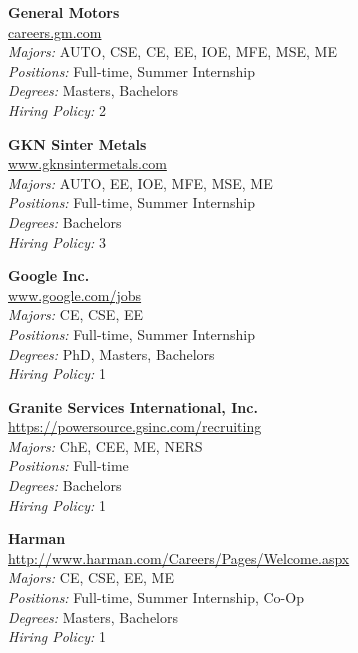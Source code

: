 \documentclass[twoside]{article}
\begin{document}
\begin{center}
\begin{multicols}{3}
\begin{minipage}{.9\columnwidth}{\Large\bf General Motors }\\
	\url{careers.gm.com}\\
	\emph{Majors:} AUTO, CSE, CE, EE, IOE, MFE, MSE, ME\\
	\emph{Positions:} Full-time, Summer Internship\\
	\emph{Degrees:} Masters, Bachelors\\
	\emph{Hiring Policy:} 2\\
\end{minipage}
 
\begin{minipage}{.9\columnwidth}{\Large\bf GKN Sinter Metals }\\
	\url{www.gknsintermetals.com}\\
	\emph{Majors:} AUTO, EE, IOE, MFE, MSE, ME\\
	\emph{Positions:} Full-time, Summer Internship\\
	\emph{Degrees:} Bachelors\\
	\emph{Hiring Policy:} 3\\
\end{minipage}
 
\begin{minipage}{.9\columnwidth}{\Large\bf Google Inc. }\\
	\url{www.google.com/jobs}\\
	\emph{Majors:} CE, CSE, EE\\
	\emph{Positions:} Full-time, Summer Internship\\
	\emph{Degrees:} PhD, Masters, Bachelors\\
	\emph{Hiring Policy:} 1\\
\end{minipage}
 
\begin{minipage}{.9\columnwidth}{\Large\bf Granite Services International, Inc. }\\
	\url{https://powersource.gsinc.com/recruiting}\\
	\emph{Majors:} ChE, CEE, ME, NERS\\
	\emph{Positions:} Full-time\\
	\emph{Degrees:} Bachelors\\
	\emph{Hiring Policy:} 1\\
\end{minipage}
 
\begin{minipage}{.9\columnwidth}{\Large\bf Harman }\\
	\url{http://www.harman.com/Careers/Pages/Welcome.aspx}\\
	\emph{Majors:} CE, CSE, EE, ME\\
	\emph{Positions:} Full-time, Summer Internship, Co-Op\\
	\emph{Degrees:} Masters, Bachelors\\
	\emph{Hiring Policy:} 1\\
\end{minipage}
 

\end{multicols}
\end{center}
\end{document}
